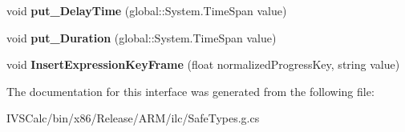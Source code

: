 \begin{DoxyCompactItemize}
\mbox{\label{interface_windows_1_1_u_i_1_1_composition_1_1_i_key_frame_animation_afda841ad947daa1748f93094624d94fe}} 
void {\bfseries put\+\_\+\+Delay\+Time} (global\+::\+System.\+Time\+Span value)
\item 
\mbox{\label{interface_windows_1_1_u_i_1_1_composition_1_1_i_key_frame_animation_a9f28c784eceb2f438715f41aa5fd2f6b}} 
void {\bfseries put\+\_\+\+Duration} (global\+::\+System.\+Time\+Span value)
\item 
\mbox{\label{interface_windows_1_1_u_i_1_1_composition_1_1_i_key_frame_animation_a0a6d3909f5a9a1a7d69b6a98a89d7487}} 
void {\bfseries Insert\+Expression\+Key\+Frame} (float normalized\+Progress\+Key, string value)
\end{DoxyCompactItemize}


The documentation for this interface was generated from the following file\+:\begin{DoxyCompactItemize}
\item 
I\+V\+S\+Calc/bin/x86/\+Release/\+A\+R\+M/ilc/Safe\+Types.\+g.\+cs\end{DoxyCompactItemize}
